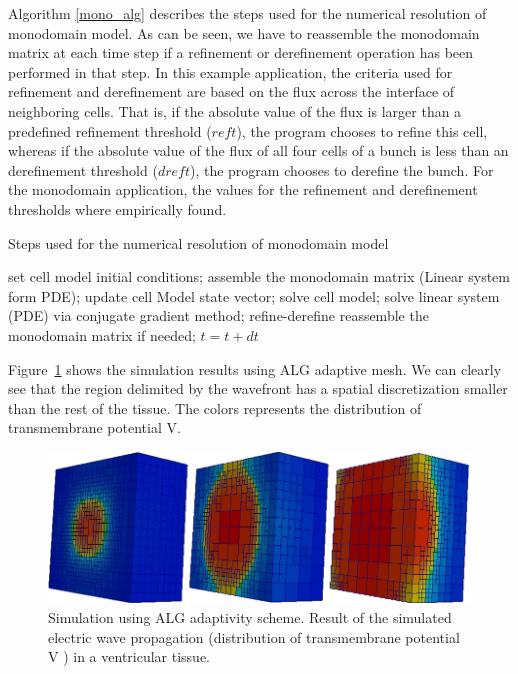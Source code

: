 Algorithm \ref{mono_alg} describes the steps used for the numerical resolution
of monodomain model. As can be seen, we have to reassemble the monodomain
matrix at each time step if a refinement or derefinement operation has been
performed in that step. In this example application, the criteria used for
refinement and derefinement are based on the flux across the interface of
neighboring cells. That is, if the absolute value of the flux is larger than a
predefined refinement threshold ($reft$), the program chooses to refine this
cell, whereas if the absolute value of the flux of all four cells of a bunch is
less than an derefinement threshold ($dreft$), the program chooses to derefine
the bunch. For the monodomain application, the values for the refinement and
derefinement thresholds where empirically found.
\begin{algorithm}[!ht]
    \caption{Steps used for the numerical resolution of monodomain model}
    \small{
    \begin{algorithmic}[1]
        \State set cell model initial conditions;
        \State assemble the monodomain matrix (Linear system form PDE);
        \State update cell Model state vector;
        \State solve cell model;
       \State solve linear system (PDE) via conjugate gradient method;
        \State refine-derefine
       \State reassemble the monodomain matrix if needed;
       \State $t = t + dt$
        \EndWhile
    \end{algorithmic}
    }
    \label{mono_alg}
\end{algorithm}

Figure~\ref{SIM_ALG3D} shows the simulation results using ALG adaptive mesh. We can
clearly see that the region delimited by the wavefront has a spatial discretization
smaller than the rest of the tissue. The colors represents the distribution of
transmembrane potential V.

\begin{figure}
    \centering
    \includegraphics[scale=0.40]{../img/onda3d.png}
    \caption{Simulation using ALG adaptivity scheme. Result of the simulated
electric wave propagation (distribution of transmembrane potential V ) in a ventricular
tissue.}
    \label{SIM_ALG3D}
\end{figure}
